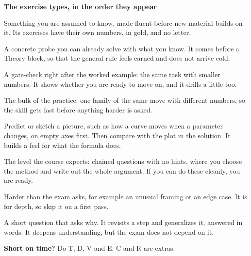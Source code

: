 \noindent\textbf{The exercise types, in the order they appear}\nopagebreak
\begin{description}[style=unboxed,leftmargin=0pt,itemsep=7pt,parsep=0pt]
\item[\legletter{\cP}{P}\hspace{0.6em}Prior knowledge] Something you are assumed to know, made fluent before new material builds on it. Its exercises
have their own numbers, in gold, and no letter.
\item[\legletter{\cO}{O}\hspace{0.6em}Orient] A concrete probe you can already solve with what you know. It comes before a Theory block, so that the
general rule feels earned and does not arrive cold.
\item[\legletter{\cT}{T}\hspace{0.6em}Test] A gate-check right after the worked example: the same task with smaller numbers. It shows whether you are
ready to move on, and it drills a little too.
\item[\legletter{\cD}{D}\hspace{0.6em}Drill] The bulk of the practice: one family of the same move with different numbers, so the skill gets fast
before anything harder is asked.
\item[\legletter{\cV}{V}\hspace{0.6em}Visualize] Predict or sketch a picture, such as how a curve moves when a parameter changes, on empty axes first.
Then compare with the plot in the solution. It builds a feel for what the formula does.
\item[\legletter{\cE}{E}\hspace{0.6em}Exam] The level the course expects: chained questions with no hints, where you choose the method and write out the
whole argument. If you can do these cleanly, you are ready.
\item[\legletter{\cC}{C}\hspace{0.6em}Challenge] Harder than the exam asks, for example an unusual framing or an edge case. It is for depth, so skip it
on a first pass.
\item[\legletter{\cR}{R}\hspace{0.6em}Reflect] A short question that asks why. It revisits a step and generalizes it, answered in words. It deepens
understanding, but the exam does not depend on it.
\end{description}
\noindent\textbf{Short on time?} Do T, D, V and E. C and R are extras.\par\medskip

